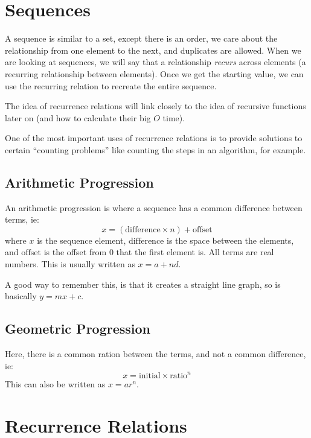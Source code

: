 \section{Sequences}\label{sec:sequencespanine}

A sequence is similar to a set, except there is an order, we care about the relationship from one element to the next, and duplicates are allowed.
When we are looking at sequences, we will say that a relationship \emph{recurs} across elements (a recurring relationship between elements).
Once we get the starting value, we can use the recurring relation to recreate the entire sequence.

The idea of recurrence relations will link closely to the idea of recursive functions later on (and how to calculate their big \(O\) time).

One of the most important uses of recurrence relations is to provide solutions to certain ``counting problems'' like counting the steps in an algorithm, for example.

\subsection{Arithmetic Progression}\label{sub:arithmetic_progression}

An arithmetic progression is where a sequence has a common difference between terms, ie:
\[
    x = (\text{difference} \times n) + \text{offset}
\]
where \(x\) is the sequence element, \(\text{difference}\) is the space between the elements, and \(\text{offset}\) is the offset from \(0\) that the first element is.
All terms are real numbers.
This is usually written as \(x=a+nd\).

\begin{note}
    A good way to remember this, is that it creates a straight line graph, so is basically \(y=mx+c\).
\end{note}

\subsection{Geometric Progression}\label{sub:geometric_progression}

Here, there is a common ration between the terms, and not a common difference, ie:
\[
    x = \text{initial} \times \text{ratio}^{n}
\]
This can also be written as \(x=ar^{n}\).

\section{Recurrence Relations}\label{sec:recurrence_relations}

